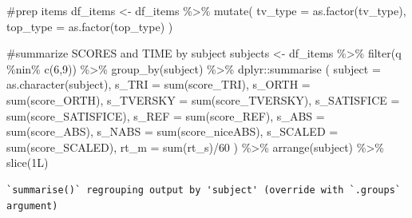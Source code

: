 \documentclass[
  letterpaper,
  DIV=11,
  numbers=noendperiod]{scrreprt}
\newenvironment{Shaded}{\begin{snugshade}}{\end{snugshade}}
\newcommand{\AttributeTok}[1]{\textcolor[rgb]{0.40,0.45,0.13}{#1}}
\newcommand{\CommentTok}[1]{\textcolor[rgb]{0.37,0.37,0.37}{#1}}
\newcommand{\DecValTok}[1]{\textcolor[rgb]{0.68,0.00,0.00}{#1}}
\newcommand{\FunctionTok}[1]{\textcolor[rgb]{0.28,0.35,0.67}{#1}}
\newcommand{\NormalTok}[1]{\textcolor[rgb]{0.00,0.23,0.31}{#1}}
\newcommand{\OtherTok}[1]{\textcolor[rgb]{0.00,0.23,0.31}{#1}}
\newcommand{\SpecialCharTok}[1]{\textcolor[rgb]{0.37,0.37,0.37}{#1}}
\begin{document}
\begin{Shaded}
\begin{Highlighting}[]
\CommentTok{\#prep items}
\NormalTok{df\_items }\OtherTok{\textless{}{-}}\NormalTok{ df\_items }\SpecialCharTok{\%\textgreater{}\%} \FunctionTok{mutate}\NormalTok{(}
  \AttributeTok{tv\_type =} \FunctionTok{as.factor}\NormalTok{(tv\_type),}
  \AttributeTok{top\_type =} \FunctionTok{as.factor}\NormalTok{(top\_type)}
\NormalTok{)}

\CommentTok{\#summarize SCORES and TIME by subject}
\NormalTok{subjects }\OtherTok{\textless{}{-}}\NormalTok{ df\_items }\SpecialCharTok{\%\textgreater{}\%} \FunctionTok{filter}\NormalTok{(q }\SpecialCharTok{\%nin\%} \FunctionTok{c}\NormalTok{(}\DecValTok{6}\NormalTok{,}\DecValTok{9}\NormalTok{)) }\SpecialCharTok{\%\textgreater{}\%} \FunctionTok{group\_by}\NormalTok{(subject) }\SpecialCharTok{\%\textgreater{}\%}\NormalTok{ dplyr}\SpecialCharTok{::}\FunctionTok{summarise}\NormalTok{ (}
  \AttributeTok{subject =} \FunctionTok{as.character}\NormalTok{(subject),}
  \AttributeTok{s\_TRI =} \FunctionTok{sum}\NormalTok{(score\_TRI),}
  \AttributeTok{s\_ORTH =} \FunctionTok{sum}\NormalTok{(score\_ORTH),}
  \AttributeTok{s\_TVERSKY =} \FunctionTok{sum}\NormalTok{(score\_TVERSKY),}
  \AttributeTok{s\_SATISFICE =} \FunctionTok{sum}\NormalTok{(score\_SATISFICE),}
  \AttributeTok{s\_REF =} \FunctionTok{sum}\NormalTok{(score\_REF),}
  \AttributeTok{s\_ABS =} \FunctionTok{sum}\NormalTok{(score\_ABS),}
  \AttributeTok{s\_NABS =} \FunctionTok{sum}\NormalTok{(score\_niceABS),}
  \AttributeTok{s\_SCALED =} \FunctionTok{sum}\NormalTok{(score\_SCALED),}
  \AttributeTok{rt\_m =} \FunctionTok{sum}\NormalTok{(rt\_s)}\SpecialCharTok{/}\DecValTok{60}
\NormalTok{) }\SpecialCharTok{\%\textgreater{}\%} \FunctionTok{arrange}\NormalTok{(subject) }\SpecialCharTok{\%\textgreater{}\%} \FunctionTok{slice}\NormalTok{(1L)}
\end{Highlighting}
\end{Shaded}

\begin{verbatim}
`summarise()` regrouping output by 'subject' (override with `.groups` argument)
\end{verbatim}
\end{document}
